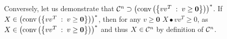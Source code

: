 \documentclass[8pt]{article} %
\begin{document}
\begin{enumerate}[label=\bfseries Problem \arabic*]
{\begin{enumerate}[label=(\alph*)]
{				Conversely, let us demonstrate that $\mathcal{C}^n\supset\left(\mbox{conv}\left(\left\{vv^T\;:\;v\geq\mathbf{0}\right\}\right)\right)^*$. If $X\in
				\left(\mbox{conv}\left(\left\{vv^T\;:\;v\geq\mathbf{0}\right\}\right)\right)^*$, then for any $v\geq\mathbf{0}$ $X\bullet vv^T\geq 0$, as $X\in
				\left(\mbox{conv}\left(\left\{vv^T\;:\;v\geq\mathbf{0}\right\}\right)\right)^*$ and thus $X\in\mathcal{C}^n$ by definition of $\mathcal{C}^n$.


				}
		\end{enumerate}}
\end{enumerate}
\end{document}

